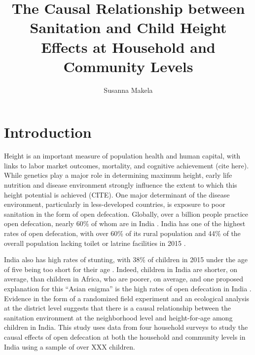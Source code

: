\documentclass[11pt,a4paper]{article}
\author{Susanna Makela}
\title{The Causal Relationship between Sanitation and Child Height \\
		\Large Effects at Household and Community Levels}
\begin{document}
\maketitle


\section{Introduction}
Height is an important measure of population health and human capital, with links to labor market outcomes, mortality, and cognitive achievement (cite here). While genetics play a major role in determining maximum height, early life nutrition and disease environment strongly influence the extent to which this height potential is achieved (CITE). One major determinant of the disease environment, particularly in less-developed countries, is exposure to poor sanitation in the form of open defecation. Globally, over a billion people practice open defecation, nearly 60\% of whom are in India \citep{jmp_2015}. India has one of the highest rates of open defecation, with over 60\% of its rural population and 44\% of the overall population lacking toilet or latrine facilities in 2015 \citep{jmp_2015}.

India also has high rates of stunting, with 38\% of children in 2015 under the age of five being too short for their age \citep{nfhs4_factsheet}. Indeed, children in India are shorter, on average, than children in Africa, who are poorer, on average, and one proposed explanation for this ``Asian enigma'' is the high rates of open defecation in India \citep{spears_intl_variation}. Evidence in the form of a randomized field experiment \citep{village_san} and an ecological analysis at the district level \citep{ecological} suggests that there is a causal relationship between the sanitation environment at the neighborhood level and height-for-age among children in India. This study uses data from four household surveys to study the causal effects of open defecation at both the household and community levels in India using a sample of over XXX children.
\end{document}
